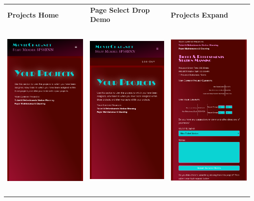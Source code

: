 \documentclass[11pt, english]{article}
\begin{document}
	\begin{center}
        	\scriptsize
        \begin{longtable}{p{5cm}p{5cm}p{5cm}}
                \textbf{Projects Home} & \textbf{Page Select Drop Demo} & \textbf{Projects Expand}\\
		\includegraphics[width=5cm,height=9cm]{CS993_IMG/staff1.png} & \includegraphics[width=5cm,height=9cm]{CS993_IMG/staff2.png} & \includegraphics[width=5cm,height=9cm]{CS993_IMG/staff4.png}\\

\end{longtable}
\end{center}
\end{document}
